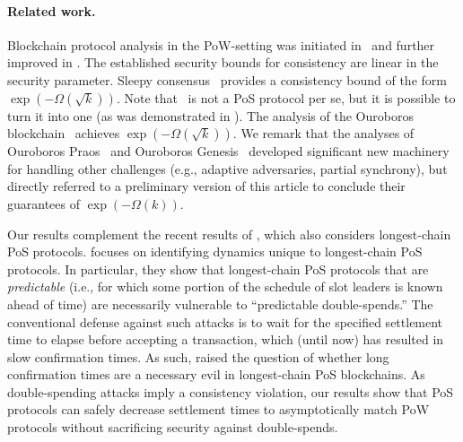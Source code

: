 \paragraph{Related work.} 
Blockchain protocol analysis in the PoW-setting was initiated
in~\cite{DBLP:conf/eurocrypt/GarayKL15} and further improved in
\cite{DBLP:conf/eurocrypt/PassSS17,DBLP:conf/crypto/GarayKL17}.  The
established security bounds for consistency are linear in the security
parameter.  Sleepy
consensus~\cite[Theorem~13]{DBLP:conf/asiacrypt/PassS17} provides a
consistency bound of the form
$\exp(-\Omega(\sqrt{k}))$. %
Note that~\cite{DBLP:conf/asiacrypt/PassS17} is not a PoS protocol per
se, but it is possible to turn it into one (as was demonstrated in
\cite{DBLP:journals/iacr/BentovPS16a}). The analysis of the Ouroboros
blockchain~\cite{KRDO17} achieves $\exp(-\Omega(\sqrt{k}))$. We remark
that the analyses of Ouroboros
Praos~\cite{DBLP:conf/eurocrypt/DavidGKR18} and Ouroboros
Genesis~\cite{DBLP:journals/iacr/BadertscherGKRZ18} developed
significant new machinery for handling other challenges (e.g.,
adaptive adversaries, partial synchrony), but directly referred to a
preliminary version of this article to conclude their guarantees of
$ \exp(-\Omega(k))$.




Our results complement the recent results of
\cite{DBLP:journals/corr/abs-1809-06528}, which also considers
longest-chain PoS protocols. \cite{DBLP:journals/corr/abs-1809-06528}
focuses on identifying dynamics unique to longest-chain PoS
protocols. In particular, they show that longest-chain PoS protocols
that are \emph{predictable} (i.e., for which some portion of the
schedule of slot leaders is known ahead of time) are necessarily
vulnerable to ``predictable double-spends.''  The conventional defense
against such attacks is to wait for the specified settlement time to
elapse before accepting a transaction, which (until now) has resulted
in slow confirmation times. As such,
\cite{DBLP:journals/corr/abs-1809-06528} raised the question of
whether long confirmation times are a necessary evil in longest-chain
PoS blockchains.  As double-spending attacks imply a consistency
violation, our results show that PoS protocols can safely decrease
settlement times to asymptotically match PoW protocols without
sacrificing security against double-spends.

